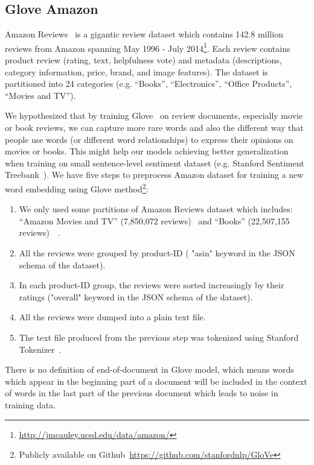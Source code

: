 %


\subsection{Glove Amazon}\label{sec:glove-amazon}
Amazon Reviews~\cite{amazon-reviews} is a gigantic review dataset
which contains 142.8 million reviews from Amazon spanning May 1996 - July 2014\footnote{\url{http://jmcauley.ucsd.edu/data/amazon/}}.
Each review contains product review (rating, text, helpfulness vote) and metadata (descriptions, category information, price, brand, and image features).
The dataset is partitioned into 24 categories (e.g. ``Books'', ``Electronics'', ``Office Products'', ``Movies and TV'').

We hypothesized that by training Glove~\cite{glove} on review documents, especially movie or book reviews, we can capture more rare words and also the different way that people use words (or different word relationships) to express their opinions on movies or books.
This might help our models achieving better generalization when training on small sentence-level sentiment dataset (e.g. Stanford Sentiment Treebank~\cite{socher2013recursive}).
%
We have five steps to preprocess Amazon dataset for training a new word embedding using Glove method\footnote{Publicly available on Github~\url{https://github.com/stanfordnlp/GloVe}}:
\begin{enumerate}
	\item We only used some partitions of Amazon Reviews dataset which includes:  ``Amazon Movies and TV'' (7,850,072 reviews)~\cite{mcauley2013hidden} and ``Books'' (22,507,155 reviews)~\cite{McAuleyTSH15}~\cite{HeM16}.
	\item All the reviews were grouped by product-ID ( "asin" keyword in the JSON schema of the dataset).
	\item In each product-ID group, the reviews were sorted increasingly by their ratings ("overall" keyword in the JSON schema of the dataset).
	\item All the reviews were dumped into a plain text file.
	\item The text file produced from the previous step was tokenized using Stanford Tokenizer~\cite{tokenizerpart}.
\end{enumerate}
There is no definition of end-of-document in Glove model, which means words which appear in the beginning part of a document will be included in the context of words in the last part of the previous document which leads to noise in training data.

